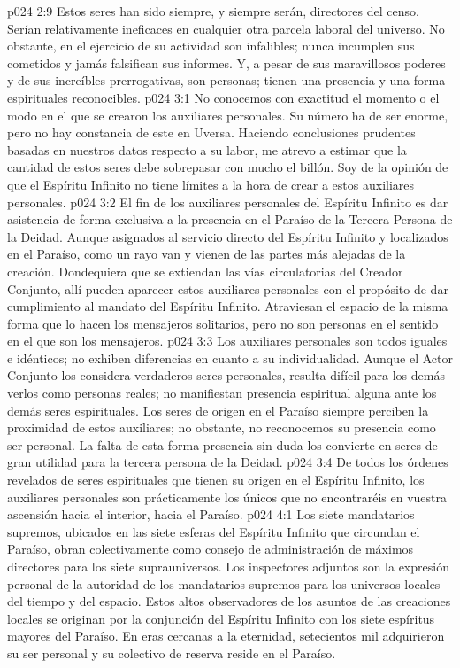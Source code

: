 \vs p024 2:9 Estos seres han sido siempre, y siempre serán, directores del censo. Serían relativamente ineficaces en cualquier otra parcela laboral del universo. No obstante, en el ejercicio de su actividad son infalibles; nunca incumplen sus cometidos y jamás falsifican sus informes. Y, a pesar de sus maravillosos poderes y de sus increíbles prerrogativas, son personas; tienen una presencia y una forma espirituales reconocibles.
\vs p024 3:1 No conocemos con exactitud el momento o el modo en el que se crearon los auxiliares personales. Su número ha de ser enorme, pero no hay constancia de este en Uversa. Haciendo conclusiones prudentes basadas en nuestros datos respecto a su labor, me atrevo a estimar que la cantidad de estos seres debe sobrepasar con mucho el billón. Soy de la opinión de que el Espíritu Infinito no tiene límites a la hora de crear a estos auxiliares personales.
\vs p024 3:2 El fin de los auxiliares personales del Espíritu Infinito es dar asistencia de forma exclusiva a la presencia en el Paraíso de la Tercera Persona de la Deidad. Aunque asignados al servicio directo del Espíritu Infinito y localizados en el Paraíso, como un rayo van y vienen de las partes más alejadas de la creación. Dondequiera que se extiendan las vías circulatorias del Creador Conjunto, allí pueden aparecer estos auxiliares personales con el propósito de dar cumplimiento al mandato del Espíritu Infinito. Atraviesan el espacio de la misma forma que lo hacen los mensajeros solitarios, pero no son personas en el sentido en el que son los mensajeros.
\vs p024 3:3 Los auxiliares personales son todos iguales e idénticos; no exhiben diferencias en cuanto a su individualidad. Aunque el Actor Conjunto los considera verdaderos seres personales, resulta difícil para los demás verlos como personas reales; no manifiestan presencia espiritual alguna ante los demás seres espirituales. Los seres de origen en el Paraíso siempre perciben la proximidad de estos auxiliares; no obstante, no reconocemos su presencia como ser personal. La falta de esta forma\hyp{}presencia sin duda los convierte en seres de gran utilidad para la tercera persona de la Deidad.
\vs p024 3:4 De todos los órdenes revelados de seres espirituales que tienen su origen en el Espíritu Infinito, los auxiliares personales son prácticamente los únicos que no encontraréis en vuestra ascensión hacia el interior, hacia el Paraíso.
\vs p024 4:1 Los siete mandatarios supremos, ubicados en las siete esferas del Espíritu Infinito que circundan el Paraíso, obran colectivamente como consejo de administración de máximos directores para los siete suprauniversos. Los inspectores adjuntos son la expresión personal de la autoridad de los mandatarios supremos para los universos locales del tiempo y del espacio. Estos altos observadores de los asuntos de las creaciones locales se originan por la conjunción del Espíritu Infinito con los siete espíritus mayores del Paraíso. En eras cercanas a la eternidad, setecientos mil adquirieron su ser personal y su colectivo de reserva reside en el Paraíso.
